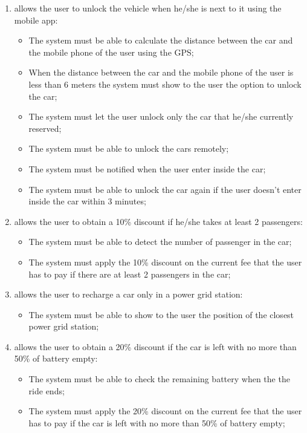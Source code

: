 \begin{enumerate}
\item allows the user to unlock the vehicle when he/she is next to it using the mobile app:

\begin{itemize}
\item The system must be able to calculate the distance between the car and the mobile phone of the user using the GPS;
\item When the distance between the car and the mobile phone of the user is less than 6 meters the system must show to the user the option to unlock the car;
\item The system must let the user unlock only the car that he/she currently reserved;
\item The system must be able to unlock the cars remotely;
\item The system must be notified when the user enter inside the car;
\item The system must be able to unlock the car again if the user doesn't enter inside the car within 3 minutes;
\end{itemize}

\item allows the user to obtain a 10\% discount if he/she takes at least 2 passengers:

\begin{itemize}
\item The system must be able to detect the number of passenger in the car;
\item The system must apply the 10\% discount on the current fee that the user has to pay if there are at least 2 passengers in the car;
\end{itemize}

\item allows the user to recharge a car only in a power grid station:

\begin{itemize}
\item The system must be able to show to the user the position of the closest power grid station;
\end{itemize}

\item allows the user to obtain a 20\% discount if the car is left with no more than 50\% of battery empty:

\begin{itemize}
\item The system must be able to check the remaining battery when the the ride ends;
\item The system must apply the 20\% discount on the current fee that the user has to pay if the car is left with no more than 50\% of battery empty;
\end{itemize}


\end{enumerate}
